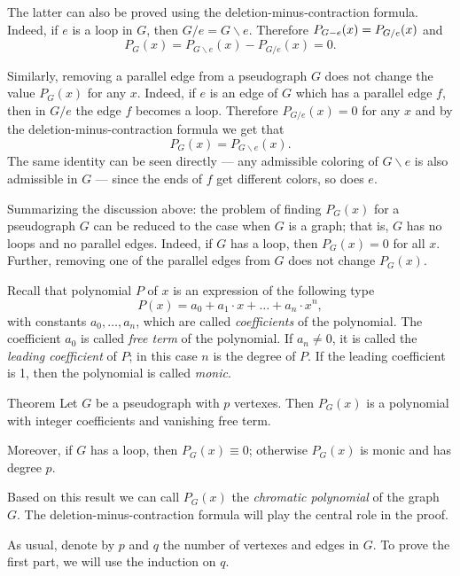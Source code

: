 The latter can also be proved using the deletion-minus-contraction formula.
Indeed, if $e$ is a loop in $G$, then $G/e=G\backslash e$.
Therefore $P_{G\backslash e}(x)\z=P_{G/e}(x)$ and
\[P_G(x)=P_{G\backslash e}(x)-P_{G/e}(x) =0.\]

Similarly, removing a parallel edge from a pseudograph $G$ does not change the value $P_G(x)$ for any $x$.
Indeed, if $e$ is an edge of $G$ which has a parallel edge $f$, then in $G/e$ the edge $f$ becomes a loop.
Therefore $P_{G/e}(x)=0$ for any $x$ and by the deletion-minus-contraction formula we get that
\[P_G(x)=P_{G\backslash e}(x).\]
The same identity can be seen directly --- any admissible coloring of $G\backslash e$ is also admissible in $G$ --- since the ends of $f$ get different colors, so does $e$. 

Summarizing the discussion above:
the problem of finding $P_G(x)$ for a pseudograph $G$ can be reduced to the case when $G$ is a graph; that is, $G$ has no loops and no parallel edges.
Indeed, if $G$ has a loop, then $P_G(x)=0$ for all $x$.
Further, removing one of the parallel edges from $G$ does not change $P_G(x)$.

Recall that polynomial $P$ of $x$ is an expression of the following type
\[P(x)=a_0+a_1\cdot x+\dots+a_n\cdot x^n,\]
with constants $a_0,\dots, a_n$, which are called {}\emph{coefficients} of the polynomial.
The coefficient $a_0$ is called \emph{free term} of the polynomial.
If $a_n\ne 0$, it is called the \emph{leading coefficient} of $P$;
in this case $n$ is the degree of $P$.
If the leading coefficient is 1, then the polynomial is called \emph{monic}.

\begin{thm}{Theorem}\label{thm:chromatic-polynomial}
Let $G$ be a pseudograph with $p$ vertexes.
Then $P_G(x)$ is a polynomial with integer coefficients and vanishing free term.

Moreover, if $G$ has a loop, then $P_G(x)\equiv 0$;
otherwise $P_G(x)$ is monic and has degree $p$.
\end{thm}

Based on this result we can call $P_G(x)$ the \emph{chromatic polynomial} of the graph~$G$.
The deletion-minus-contraction formula will play the central role in the proof.

As usual, denote by $p$ and $q$ the number of vertexes and edges in $G$.
To prove the first part, we will use the induction on $q$.

